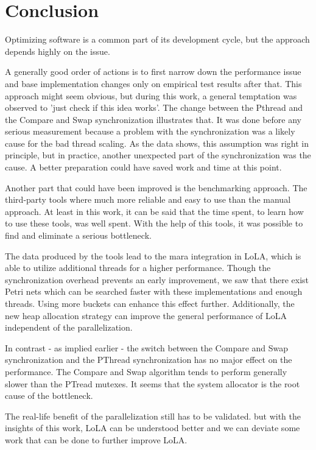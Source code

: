 \chapter{Conclusion}
Optimizing software is a common part of its development cycle, but the approach depends highly on the issue.

A generally good order of actions is to first narrow down the performance issue and base implementation changes only on empirical test results after that. This approach might seem obvious, but during this work, a general temptation was observed to 'just check if this idea works'. The change between the Pthread and the Compare and Swap synchronization illustrates that. It was done before any serious measurement because a problem with the synchronization was a likely cause for the bad thread scaling. As the data shows, this assumption was right in principle, but in practice, another unexpected part of the synchronization was the cause. A better preparation could have saved work and time at this point.

Another part that could have been improved is the benchmarking approach. The third-party tools where much more reliable and easy to use than the manual approach. At least in this work, it can be said that the time spent, to learn how to use these tools, was well spent. With the help of this tools, it was possible to find and eliminate a serious bottleneck.

The data produced by the tools lead to the mara integration in LoLA, which is able to utilize additional threads for a higher performance. Though the synchronization overhead prevents an early improvement, we saw that there exist Petri nets which can be searched faster with these implementations and enough threads. Using more buckets can enhance this effect further. Additionally, the new heap allocation strategy can improve the general performance of LoLA independent of the parallelization.

In contrast - as implied earlier - the switch between the Compare and Swap synchronization and the PThread synchronization has no major effect on the performance. The Compare and Swap algorithm tends to perform generally slower than the PTread mutexes. It seems that the system allocator is the root cause of the bottleneck.

The real-life benefit of the parallelization still has to be validated. but with the insights of this work, LoLA can be understood better and we can deviate some work that can be done to further improve LoLA. 